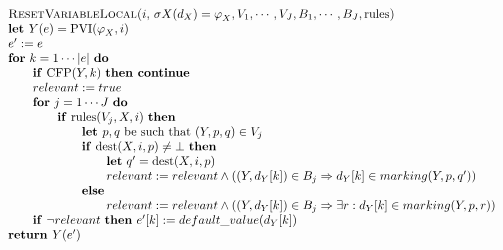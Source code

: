 \begin{equation*}
\begin{tabular}{l}
\textsc{ResetVariableLocal(}$i,$ $\sigma X(d_{X})=\varphi _{X},V_{1},\cdots
,V_{J},B_{1},\cdots ,B_{J},\mathrm{rules}$\textsc{)} \\ 
\textbf{let }$Y(e)=\mathrm{PVI}(\varphi _{X},i)$ \\ 
$e^{\prime }:=e$ \\ 
\textbf{for} $k=1\cdots \left\vert e\right\vert $ \textbf{do} \\ 
$\qquad $\textbf{if} $\mathrm{CFP}(Y,k)$ \textbf{then continue} \\ 
$\qquad relevant:=true$ \\ 
$\qquad $\textbf{for} $j=1\cdots J$ \textbf{do} \\ 
$\qquad \qquad $\textbf{if} $\mathrm{rules}(V_{j},X,i)$ \textbf{then} \\ 
$\qquad \qquad \qquad $\textbf{let }$p,q$ be such that $(Y,p,q)\in V_{j}$ \\ 
$\qquad \qquad \qquad $\textbf{if} $\mathrm{dest}(X,i,p)\neq \bot $ \textbf{%
then} \\ 
$\qquad \qquad \qquad \qquad $\textbf{let} $q^{\prime }=\mathrm{dest}(X,i,p)$
\\ 
$\qquad \qquad \qquad \qquad relevant:=relevant\wedge \left( \left(
Y,d_{Y}[k]\right) \in B_{j}\Rightarrow d_{Y}[k]\in marking(Y,p,q^{\prime
})\right) $ \\ 
$\qquad \qquad \qquad $\textbf{else} \\ 
$\qquad \qquad \qquad \qquad relevant:=relevant\wedge (\left(
Y,d_{Y}[k]\right) \in B_{j}\Rightarrow \exists r:d_{Y}[k]\in marking(Y,p,r))$
\\ 
$\qquad $\textbf{if} $\lnot relevant$ \textbf{then} $e^{\prime
}[k]:=default\_value(d_{Y}[k])$ \\ 
\textbf{return }$Y(e^{\prime })$%
\end{tabular}%
\end{equation*}%
\newpage


